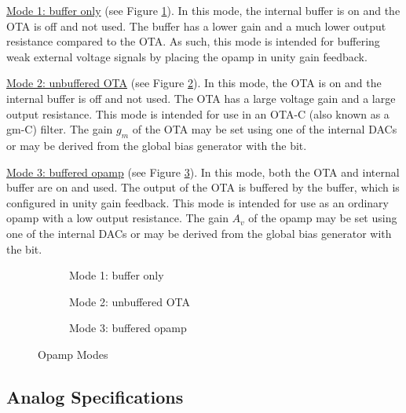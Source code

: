 \underline{Mode 1: buffer only} (see Figure \ref{fig:opamp-mode-buffer}). In this mode, the internal buffer is on and the OTA is off and not used. The buffer has a lower gain and a much lower output resistance compared to the OTA. As such, this mode is intended for buffering weak external voltage signals by placing the opamp in unity gain feedback.

\underline{Mode 2: unbuffered OTA} (see Figure \ref{fig:opamp-mode-unbuffered-ota}). In this mode, the OTA is on and the internal buffer is off and not used. The OTA has a large voltage gain and a large output resistance. This mode is intended for use in an OTA-C (also known as a gm-C) filter. The gain $g_m$ of the OTA may be set using one of the internal DACs or may be derived from the global bias generator with the  bit.

\underline{Mode 3: buffered opamp} (see Figure \ref{fig:opamp-mode-buffered-ota}). In this mode, both the OTA and internal buffer are on and used. The output of the OTA is buffered by the buffer, which is configured in unity gain feedback. This mode is intended for use as an ordinary opamp with a low output resistance. The gain $A_v$ of the opamp may be set using one of the internal DACs or may be derived from the global bias generator with the  bit.

\begin{figure}[htpb]
	\centering
	\begin{subfigure}[b]{.45\linewidth}
		
		\caption{Mode 1: buffer only}
		\label{fig:opamp-mode-buffer}
	\end{subfigure}
	\begin{subfigure}[b]{.45\linewidth}
		
		\caption{Mode 2: unbuffered OTA}
		\label{fig:opamp-mode-unbuffered-ota}
	\end{subfigure}
	\begin{subfigure}[b]{.45\linewidth}
		
		\caption{Mode 3: buffered opamp}
		\label{fig:opamp-mode-buffered-ota}
	\end{subfigure}
	\caption{Opamp Modes}
	\label{fig:opamp-modes}
\end{figure}



\subsection{Analog Specifications}

